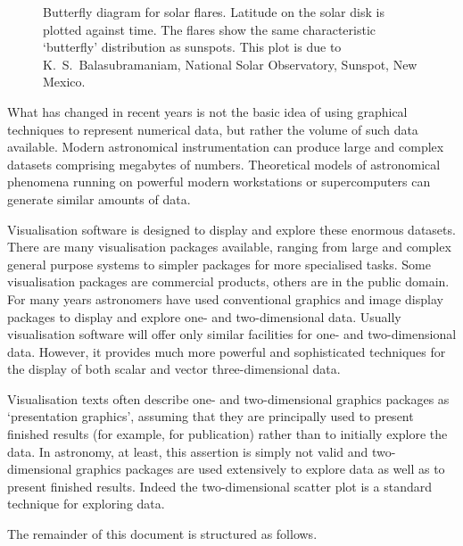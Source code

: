 
\begin{figure}[htbp]

\begin{center}
\leavevmode
\epsfxsize=449pt
\end{center}

\caption[Butterfly diagram for solar flares.]{Butterfly diagram for
solar flares. Latitude on the solar disk is plotted against time. The
flares show the same characteristic `butterfly' distribution as
sunspots. This plot is due to K.~S.~Balasubramaniam, National Solar 
Observatory, Sunspot, New Mexico. \label{SUNSPOT} }

\end{figure}

What has changed in recent years is not the basic idea of using
graphical techniques to represent numerical data, but rather the volume
of such data available. Modern astronomical instrumentation can produce
large and complex datasets comprising megabytes of numbers. Theoretical
models of astronomical phenomena running on powerful modern workstations
or supercomputers can generate similar amounts of data.

Visualisation software is designed to display and explore these enormous
datasets. There are many visualisation packages available, ranging from
large and complex general purpose systems to simpler packages for more
specialised tasks. Some visualisation packages are commercial products,
others are in the public domain. For many years astronomers have used
conventional graphics and image display packages to display and explore
one- and two-dimensional data. Usually visualisation software will offer
only similar facilities for one- and two-dimensional data. However, it
provides much more powerful and sophisticated techniques for the
display of both scalar and vector three-dimensional data.

Visualisation texts often describe one- and two-dimensional graphics
packages as `presentation graphics', assuming that they are principally
used to present finished results (for example, for publication) rather
than to initially explore the data. In astronomy, at least, this
assertion is simply not valid and two-dimensional graphics packages are
used extensively to explore data as well as to present finished results.
Indeed the two-dimensional scatter plot is a standard technique for
exploring data.

The remainder of this document is structured as follows.

